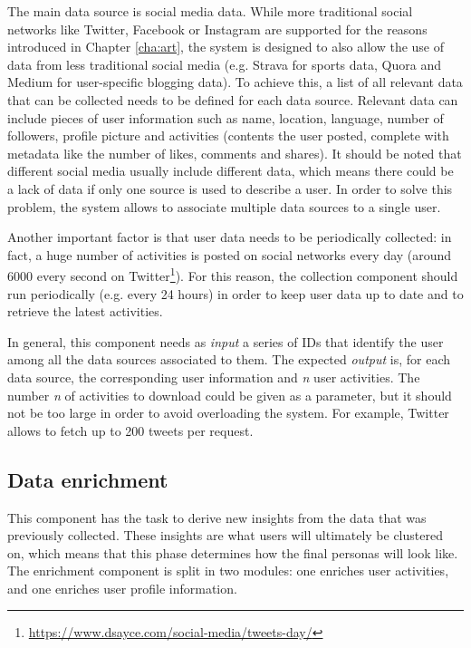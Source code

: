 The main data source is social media data. While more traditional social networks like Twitter, Facebook or Instagram are supported for the reasons introduced in Chapter \ref{cha:art}, the system is designed to also allow the use of data from less traditional social media (e.g. Strava for sports data, Quora and Medium for user-specific blogging data). To achieve this, a list of all relevant data that can be collected needs to be defined for each data source. Relevant data can include pieces of user information such as name, location, language, number of followers, profile picture and activities (contents the user posted, complete with metadata like the number of likes, comments and shares). It should be noted that different social media usually include different data, which means there could be a lack of data if only one source is used to describe a user. In order to solve this problem, the system allows to associate multiple data sources to a single user.

Another important factor is that user data needs to be periodically collected: in fact, a huge number of activities is posted on social networks every day (around 6000 every second on Twitter\footnote{\url{https://www.dsayce.com/social-media/tweets-day/}}). For this reason, the collection component should run periodically (e.g. every 24 hours) in order to keep user data up to date and to retrieve the latest activities.

In general, this component needs as \textit{input} a series of IDs that identify the user among all the data sources associated to them. The expected \textit{output} is, for each data source, the corresponding user information and \textit{n} user activities. The number \textit{n} of activities to download could be given as a parameter, but it should not be too large in order to avoid overloading the system. For example, Twitter allows to fetch up to 200 tweets per request.

\subsection{Data enrichment}
This component has the task to derive new insights from the data that was previously collected. These insights are what users will ultimately be clustered on, which means that this phase determines how the final personas will look like. The enrichment component is split in two modules: one enriches user activities, and one enriches user profile information.

